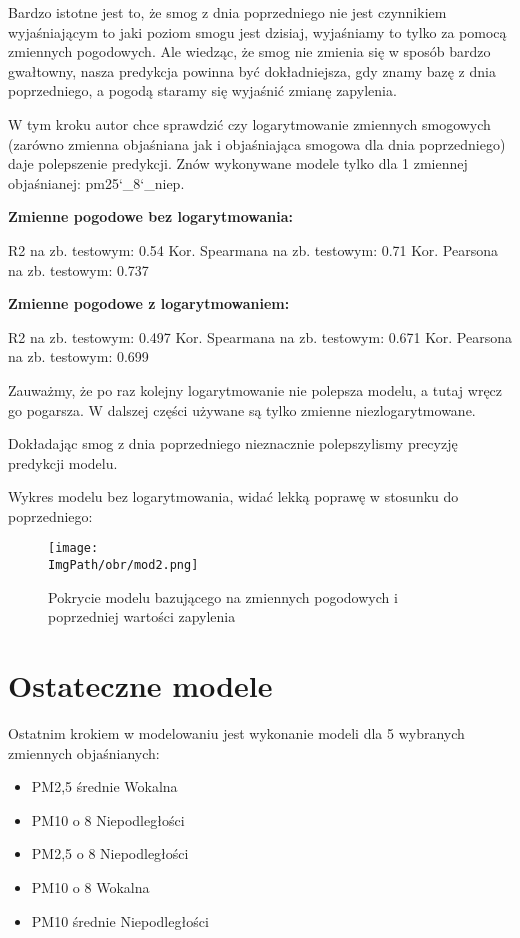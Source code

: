 \documentclass[a4paper,12pt,twoside,openany]{report}
\newcommand{\ImgPath}{.}
\begin{document}
Bardzo istotne jest to, że smog z dnia poprzedniego nie jest czynnikiem wyjaśniającym to jaki poziom smogu jest dzisiaj, wyjaśniamy to tylko za pomocą zmiennych pogodowych. Ale wiedząc, że smog nie zmienia się w sposób bardzo gwałtowny, nasza predykcja powinna być dokładniejsza, gdy znamy bazę z dnia poprzedniego, a pogodą staramy się wyjaśnić zmianę zapylenia.

W tym kroku autor chce sprawdzić czy logarytmowanie zmiennych smogowych (zarówno zmienna objaśniana jak i objaśniająca smogowa dla dnia poprzedniego) daje polepszenie predykcji. Znów wykonywane modele tylko dla 1 zmiennej objaśnianej: pm25\char`_8\char`_niep.

\textbf{Zmienne pogodowe bez logarytmowania:}

R2 na zb. testowym:  0.54
Kor. Spearmana na zb. testowym: 0.71
Kor. Pearsona na zb. testowym: 0.737


\textbf{Zmienne pogodowe z logarytmowaniem:}

R2 na zb. testowym: 0.497
Kor. Spearmana na zb. testowym: 0.671
Kor. Pearsona na zb. testowym: 0.699

Zauważmy, że po raz kolejny logarytmowanie nie polepsza modelu, a tutaj wręcz go pogarsza. W dalszej części używane są tylko zmienne niezlogarytmowane.

Dokładając smog z dnia poprzedniego nieznacznie polepszylismy precyzję predykcji modelu.

Wykres modelu bez logarytmowania, widać lekką poprawę w stosunku do poprzedniego:

\begin{figure}[H]
	\begin{center}
		\centering
		\texttt{[image: \\ImgPath/obr/mod2.png]}
	\end{center}
	\caption{Pokrycie modelu bazującego na zmiennych pogodowych i poprzedniej wartości zapylenia}
	\label{mod2}
\end{figure}

\section{Ostateczne modele}
Ostatnim krokiem w modelowaniu jest wykonanie modeli dla 5 wybranych zmiennych objaśnianych:

\begin{itemize}
	\item PM2,5 średnie Wokalna
	\item PM10 o 8 Niepodległości
	\item PM2,5 o 8 Niepodległości
	\item PM10 o 8 Wokalna
	\item PM10 średnie Niepodległości
\end{itemize}
\end{document}
